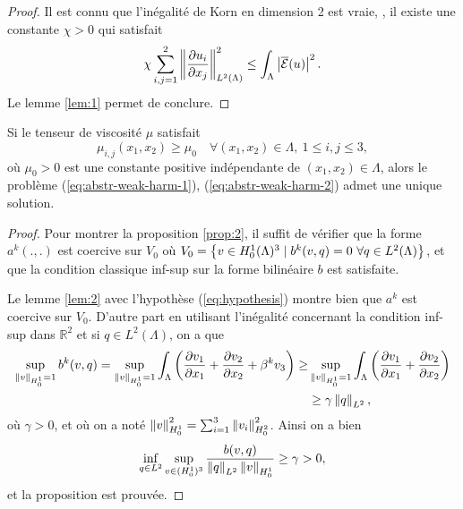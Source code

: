 \begin{proof}
Il est connu que l'inégalité de Korn en dimension 2 est vraie, \ie, il
existe une constante $\chi > 0$ qui satisfait
\begin{equation}
\chi\sum_{i,j = 1}^2 \left\lVert \frac{\partial u_i}{\partial
    x_j} \right\rVert^2_{L^2(\Lambda)} \leq \int_\Lambda \left\lvert \overline{\mathcal E}(u) \right\rvert^2.
\end{equation}
Le lemme \ref{lem:1} permet de conclure.
\end{proof}

\begin{proposition}\label{prop:2}
  Si le tenseur de viscosité $\mu$ satisfait
\begin{equation}
  \mu_{i,j}(x_1,x_2) \geq \mu_0\quad \forall (x_1, x_2)\in \Lambda,\ 1
  \leq i,j \leq 3,\label{eq:hypothesis}
\end{equation}
où $\mu_0 > 0$ est une constante positive indépendante de $(x_1,
x_2)\in \Lambda$, alors le problème (\ref{eq:abstr-weak-harm-1}),
(\ref{eq:abstr-weak-harm-2}) admet une unique solution.
\end{proposition}

\begin{proof}
  Pour montrer la proposition \ref{prop:2}, il suffit de vérifier
  que la forme $a^k(.,.)$ est coercive sur $V_0$ où $V_0 = \left\{ v
    \in H_0^1(\Lambda)^3\mid b^k(v, q) = 0\ \forall q \in
    L^2(\Lambda) \right\}$, et que la condition classique inf-sup sur la forme
  bilinéaire $b$ est satisfaite.

  Le lemme \ref{lem:2} avec l'hypothèse (\ref{eq:hypothesis}) montre
  bien que $a^k$ est coercive sur $V_0$. D'autre part en utilisant
  l'inégalité concernant la condition inf-sup dans $\mathbb R^2$ et si
  $q\in L^2(\Lambda)$, on a que
  \begin{align*}
    \sup_{\left\lVert v \right\rVert_{H^1_0} = 1} b^k(v,q)
    = \sup_{\left\lVert v \right\rVert_{H^1_0} = 1} \int_{\Lambda}\left( \frac{\partial v_1}{\partial x_1} + \frac{\partial v_2}{\partial x_2} + \beta^k v_3 \right)
    \geq & \sup_{\left\lVert v \right\rVert_{H^1_0} = 1}\int_{\Lambda}\left( \frac{\partial v_1}{\partial x_1} + \frac{\partial v_2}{\partial x_2} \right)\\
    &\geq \gamma \left\lVert q \right\rVert_{L^2},
  \end{align*}
  où $\gamma > 0$, et où on a noté $\left\lVert v \right\rVert_{H_0^1}^2 = \sum_{i =
    1}^3 \left\lVert v_i \right\rVert_{H_0^2}^2$. Ainsi on a bien
  \begin{equation}
    \inf_{q\in L^2}\sup_{v\in (H_0^1)^3} \frac{b(v,
      q)}{\left\lVert q \right\rVert_{L^2}\left\lVert v \right\rVert_{H^1_0}} \geq \gamma > 0,
  \end{equation}
  et la proposition est prouvée.
\end{proof}

